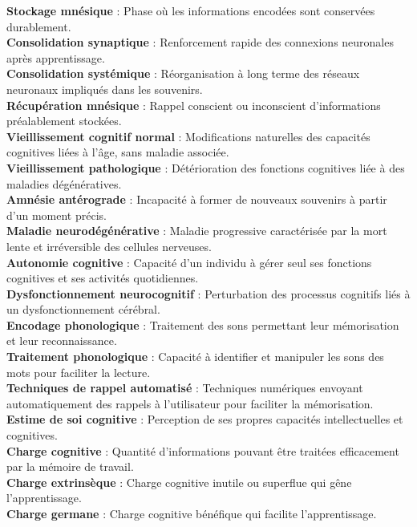 \documentclass[11pt,a4paper]{report}
\begin{document}
\textbf{Stockage mnésique} : Phase où les informations encodées sont conservées durablement.\\
\textbf{Consolidation synaptique} : Renforcement rapide des connexions neuronales après apprentissage.\\
\textbf{Consolidation systémique} : Réorganisation à long terme des réseaux neuronaux impliqués dans les souvenirs.\\
\textbf{Récupération mnésique} : Rappel conscient ou inconscient d'informations préalablement stockées.\\
\textbf{Vieillissement cognitif normal} : Modifications naturelles des capacités cognitives liées à l’âge, sans maladie associée.\\
\textbf{Vieillissement pathologique} : Détérioration des fonctions cognitives liée à des maladies dégénératives.\\
\textbf{Amnésie antérograde} : Incapacité à former de nouveaux souvenirs à partir d’un moment précis.\\
\textbf{Maladie neurodégénérative} : Maladie progressive caractérisée par la mort lente et irréversible des cellules nerveuses.\\
\textbf{Autonomie cognitive} : Capacité d’un individu à gérer seul ses fonctions cognitives et ses activités quotidiennes.\\
\textbf{Dysfonctionnement neurocognitif} : Perturbation des processus cognitifs liés à un dysfonctionnement cérébral.\\
\textbf{Encodage phonologique} : Traitement des sons permettant leur mémorisation et leur reconnaissance.\\
\textbf{Traitement phonologique} : Capacité à identifier et manipuler les sons des mots pour faciliter la lecture.\\
\textbf{Techniques de rappel automatisé} : Techniques numériques envoyant automatiquement des rappels à l’utilisateur pour faciliter la mémorisation.\\
\textbf{Estime de soi cognitive} : Perception de ses propres capacités intellectuelles et cognitives.\\
\textbf{Charge cognitive} : Quantité d'informations pouvant être traitées efficacement par la mémoire de travail.\\
\textbf{Charge extrinsèque} : Charge cognitive inutile ou superflue qui gêne l’apprentissage.\\
\textbf{Charge germane} : Charge cognitive bénéfique qui facilite l’apprentissage.\\
\end{document}
